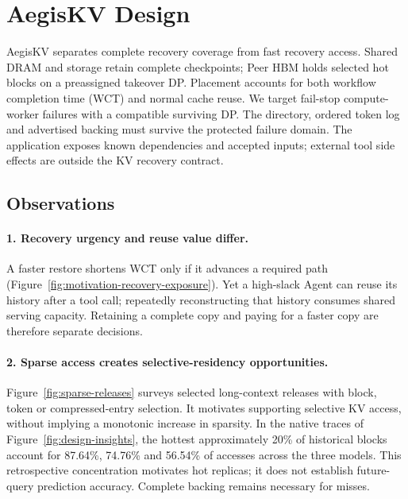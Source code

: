 \section{AegisKV Design}
\label{sec:design}

AegisKV separates complete recovery coverage from fast recovery access.
Shared DRAM and storage retain complete checkpoints; Peer HBM holds
selected hot blocks on a preassigned takeover DP. Placement accounts for
both workflow completion time (WCT) and normal cache reuse.
We target fail-stop compute-worker failures with a compatible surviving
DP. The directory, ordered token log and advertised backing must survive
the protected failure domain. The application exposes known dependencies
and accepted inputs; external tool side effects are outside the KV
recovery contract.

\subsection{Observations}
\label{sec:design-insights}

\paragraph{1. Recovery urgency and reuse value differ.}
A faster restore shortens WCT only if it advances a required path
(Figure~\ref{fig:motivation-recovery-exposure}). Yet a high-slack Agent
can reuse its history after a tool call; repeatedly reconstructing that
history consumes shared serving capacity. Retaining a complete copy and
paying for a faster copy are therefore separate decisions.

\paragraph{2. Sparse access creates selective-residency opportunities.}
Figure~\ref{fig:sparse-releases} surveys selected long-context releases
with block, token or compressed-entry selection. It motivates supporting
selective KV access, without implying a monotonic increase in sparsity.
In the native traces of Figure~\ref{fig:design-insights}, the hottest
approximately 20\% of historical blocks account for 87.64\%, 74.76\%
and 56.54\% of accesses across the three models. This retrospective
concentration motivates hot replicas; it does not establish future-query
prediction accuracy. Complete backing remains necessary for misses.

